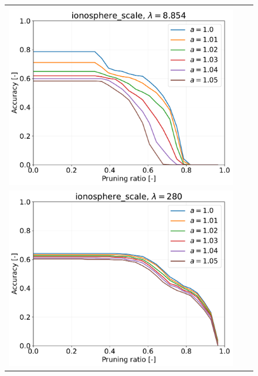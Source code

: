 \begin{figure}[H]
\begin{tabular}{ccc}
		\begin{minipage}[b]{0.3\hsize}\centering {\small Dataset: ionosphere, $\lambda=n \cdot 10^{-1.5}$}\\\includegraphics[width=0.8\hsize]{fig/ionosphere/kernel_ss_screening_rate_lam8.854_x_n_y_etest.pdf}\end{minipage}
		&
		\begin{minipage}[b]{0.3\hsize}\centering {\small Dataset: ionosphere, $\lambda=n$}\\\includegraphics[width=0.8\hsize]{fig/ionosphere/kernel_ss_screening_rate_lam280_x_n_y_etest.pdf}\end{minipage}
		\\

\end{tabular}
\end{figure}

